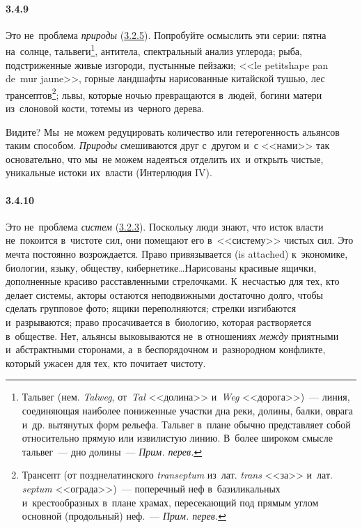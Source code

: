 \paragraph{3.4.9}\hypertarget{par:3.4.9}{} Это не~проблема {\itshape природы} (\hyperlink{par:3.2.5}{3.2.5}). Попробуйте осмыслить эти серии: пятна на~солнце, тальвеги\footnote{Тальвег (нем. {\itshape Talweg}, от~{\itshape Tal} <<долина>> и~{\itshape Weg} <<дорога>>)~--- линия, соединяющая наиболее пониженные участки дна реки, долины, балки, оврага и~др. вытянутых форм рельефа. Тальвег в~плане обычно представляет собой относительно прямую или извилистую линию. В~более широком смысле тальвег~--- дно долины~--- {\itshape Прим. перев.}}, антитела, спектральный анализ углерода; рыба, подстриженные живые изгороди, пустынные пейзажи; <<le petitshape pan de~mur jaune>>, горные ландшафты нарисованные китайской тушью, лес трансептов\footnote{Трансепт (от позднелатинского {\itshape transeptum} из~лат. {\itshape trans} <<за>> и~лат. {\itshape septum} <<ограда>>)~--- поперечный неф в~базиликальных и~крестообразных в~плане храмах, пересекающий под прямым углом основной (продольный) неф.~--- {\itshape Прим. перев.}}; львы, которые ночью превращаются в~людей, богини матери из~слоновой кости, тотемы из~черного дерева.

Видите? Мы~не можем редуцировать количество или гетерогенность альянсов таким способом. {\itshape Природы} смешиваются друг с~другом и~с <<нами>> так основательно, что мы~не можем надеяться отделить их~и открыть чистые, уникальные истоки их~власти (Интерлюдия IV).

\paragraph{3.4.10}\hypertarget{par:3.4.10}{} Это не~проблема {\itshape систем} (\hyperlink{par:3.2.3}{3.2.3}). Поскольку люди знают, что исток власти не~покоится в~чистоте сил, они помещают его в~<<систему>> чистых сил. Это мечта постоянно возрождается. Право привязывается (is attached) к~экономике, биологии, языку, обществу, кибернетике\ldots Нарисованы красивые ящички, дополненные красиво расставленными стрелочками. К~несчастью для тех, кто делает системы, акторы остаются неподвижными достаточно долго, чтобы сделать групповое фото; ящики переполняются; стрелки изгибаются и~разрываются; право просачивается в~биологию, которая растворяется в~обществе. Нет, альянсы выковываются не~в отношениях {\itshape между} приятными и~абстрактными сторонами, а~в беспорядочном и~разнородном конфликте, который ужасен для тех, кто почитает чистоту.

